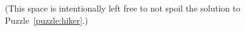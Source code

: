 \documentclass{article}\usepackage[a4paper,margin=20mm]{geometry}
\begin{document}










\vfill
\begin{center}
  (This space is intentionally left free to not spoil the solution to Puzzle~\ref{puzzle:hiker}.)
\end{center}
\vfill
\clearpage
\end{document}
